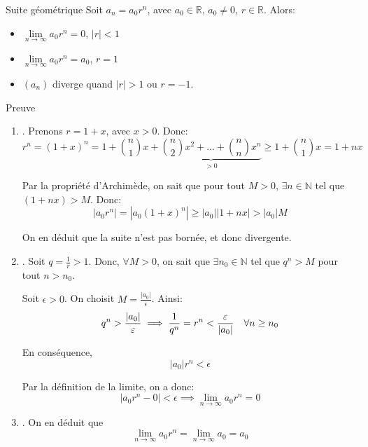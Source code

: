 \documentclass[a4paper]{article}
\begin{document}
\begin{parag}{Suite géométrique}
    Soit $a_n = a_0 r^{n}$, avec $a_0 \in \mathbb{R}$, $a_0 \neq 0$, $r \in \mathbb{R}$. Alors: 
    \begin{itemize}
        \item $\lim\limits_{n \to \infty} a_0 r^{n} = 0$, $\left|r\right| < 1$
        \item $\lim\limits_{n \to \infty} a_0 r^{n} = a_0$, $r = 1$
        \item $\left(a_n\right)$ diverge quand $\left|r\right| > 1$ ou $r = -1$.
    \end{itemize}
    
    \begin{subparag}{Preuve}
        \begin{enumerate}[left=0pt]
            \item {}. Prenons $r = 1 + x$, avec $x > 0$. Donc: 
            \[r^n = \left(1 + x\right)^n = 1 + \binom{n}{1}x + \underbrace{\binom{n}{2}x^2 + \ldots + \binom{n}{n}x^n}_{>0} \geq 1 + \binom{n}{1}x = 1 + nx\]
         
            Par la propriété d'Archimède, on sait que pour tout $M > 0$, $\exists n \in \mathbb{N}$ tel que $(1 + nx) > M$. Donc: 
            \[\left|a_0 r^n\right| = \left|a_0 \left(1 + x\right)^{n}\right| \geq \left|a_0\right|\left|1 + nx\right| > \left|a_0\right|M\]


            On en déduit que la suite n'est pas bornée, et donc divergente.

            \vspace{1em}

            \item {}. Soit $q = \frac{1}{r} > 1$. Donc, $\forall M > 0$, on sait que $\exists n_0 \in \mathbb{N}$ tel que $q^{n} > M$ pour tout $n > n_0$.

            Soit $\epsilon > 0$. On choisit $M = \frac{\left|a_0\right|}{\epsilon} $. Ainsi: 
            \[q^{n} > \frac{\left|a_0\right|}{\epsilon} \implies \frac{1}{q^{n}} = r^{n} < \frac{\epsilon}{\left|a_0\right|} \mathspace \forall n \geq n_0\]
            
            En conséquence, 
            \[\left|a_0\right|r^{n} < \epsilon\]

            Par la définition de la limite, on a donc: 
            \[\left|a_0 r^n - 0\right| < \epsilon \implies \lim_{n \to \infty} a_0 r^{n} = 0\]
            
            \item {}. On en déduit que 
            \[\lim_{n \to \infty} a_0 r^{n} = \lim_{n \to \infty} a_0 = a_0\]
            

\end{enumerate}
\end{subparag}
\end{parag}
\end{document}
